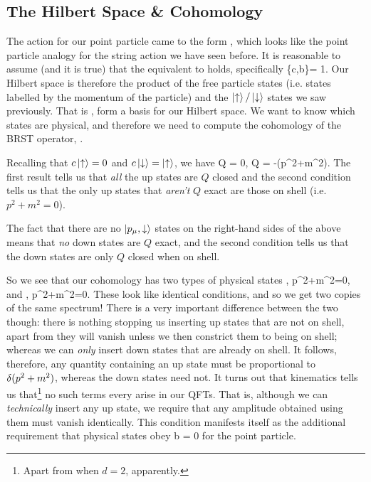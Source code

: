 \subsection{The Hilbert Space \& Cohomology}

The action for our point particle came to the form , which looks like the point particle analogy for the string action we have seen before. It is reasonable to assume (and it is true) that the equivalent to  holds, specifically 
\bse
    \{c,b\}= 1.
\ese 
Our Hilbert space is therefore the product of the free particle states (i.e. states labelled by the momentum of the particle) and the $\ket{\uparrow}/\ket{\downarrow}$ states we saw previously. That is 
\bse 
    , \qand {}
\ese
form a basis for our Hilbert space. We want to know which states are physical, and therefore we need to compute the cohomology of the BRST operator, .

Recalling that $c\ket{\uparrow}=0$ and $c\ket{\downarrow}=\ket{\uparrow}$, we have 
\bse 
    Q = 0, \qand Q = -\big(p^2+m^2\big).
\ese 
The first result tells us that \textit{all} the up states are $Q$ closed and the second condition tells us that the only up states that \textit{aren't} $Q$ exact are those on shell (i.e. $p^2+m^2=0$). 

The fact that there are no $\ket{p_{\mu},\downarrow}$ states on the right-hand sides of the above means that \textit{no} down states are $Q$ exact, and the second condition tells us that the down states are only $Q$ closed when on shell. 

So we see that our cohomology has two types of physical states 
\bse 
    , \quad p^2+m^2=0, 
\ese 
and 
\bse 
    , \quad p^2+m^2=0.
\ese
These look like identical conditions, and so we get two copies of the same spectrum! There is a very important difference between the two though: there is nothing stopping us inserting up states that are not on shell, apart from they will vanish unless we then constrict them to being on shell; whereas we can \textit{only} insert down states that are already on shell. It follows, therefore, any quantity containing an up state must be proportional to $\delta(p^2+m^2)$, whereas the down states need not. It turns out that kinematics tells us that\footnote{Apart from when $d=2$, apparently.} no such terms every arise in our QFTs. That is, although we can \textit{technically} insert any up state, we require that any amplitude obtained using them must vanish identically. This condition manifests itself as the additional requirement that physical states obey 
\bse 
    b\ket{\psi} = 0
\ese
for the point particle.

